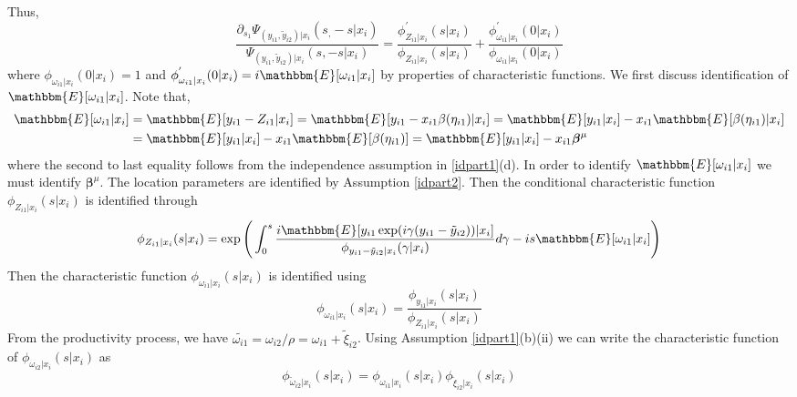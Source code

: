 \documentclass[11pt]{article}
\begin{document}
Thus,
\begin{equation*}
\frac{\partial_{s_{1}}\Psi_{(y_{i1}, \tilde{y}_{i2})|x_{i}}(s_, -s|x_{i})}{\Psi_{(y_{i1}, \tilde{y}_{i2})|x_{i}}(s, -s|x_{i})}=\frac{\phi^{'}_{Z_{i1}|x_{i}}(s|x_{i})}{\phi_{Z_{i1}|x_{i}}(s|x_{i})}+\frac{\phi^{'}_{\omega_{i1}|x_{i}}(0|x_{i})}{\phi_{\omega_{i1}|x_{i}}(0|x_{i})}
\end{equation*}
where $\phi_{\omega_{i1}|x_{i}}(0|x_{i})=1$ and $\phi^{'}_{\omega_{i1}|x_{i}}(0|x_{i})=i\mathbbm{E}[\omega_{i1}|x_{i}]$ by properties of characteristic functions. We first discuss identification of $\mathbbm{E}[\omega_{i1}|x_{i}]$. Note that,
\begin{equation*}
\begin{split}
\mathbbm{E}[\omega_{i1}|x_{i}]&=\mathbbm{E}[y_{i1}-Z_{i1}|x_{i}]=\mathbbm{E}[y_{i1}-x_{i1}\beta(\eta_{i1})|x_{i}]=\mathbbm{E}[y_{i1}|x_{i}]-x_{i1}\mathbbm{E}[\beta(\eta_{i1})|x_{i}]\\
&=\mathbbm{E}[y_{i1}|x_{i}]-x_{i1}\mathbbm{E}[\beta(\eta_{i1})]=\mathbbm{E}[y_{i1}|x_{i}]-x_{i1}\boldsymbol{\beta}^{\mu}
\end{split}
\end{equation*}
where the second to last equality follows from the independence assumption in \eqref{idpart1}(d). In order to identify $\mathbbm{E}[\omega_{i1}|x_{i}]$ we must identify $\boldsymbol{\beta}^{\mu}$. The location parameters are identified by Assumption \ref{idpart2}. Then the conditional characteristic function $\phi_{Z_{i1}|x_{i}}(s|x_{i})$ is identified through
\begin{equation*}
\phi_{Z_{i1}|x_{i}}(s|x_{i})=\exp\Bigg(\int_{0}^{s}\frac{i\mathbbm{E}[y_{i1}\exp(i\gamma(y_{i1}-\tilde{y}_{i2}))|x_{i}]}{\phi_{y_{i1}-\tilde{y}_{i2}|x_{i}}(\gamma|x_{i})}d\gamma-is\mathbbm{E}[\omega_{i1}|x_{i}]\Bigg)
\end{equation*}
Then the characteristic function $\phi_{\omega_{i1}|x_{i}}(s|x_{i})$ is identified using
\begin{equation*}
\phi_{\omega_{i1}|x_{i}}(s|x_{i})=\frac{\phi_{y_{i1}|x_{i}}(s|x_{i})}{\phi_{Z_{i1}|x_{i}}(s|x_{i})}
\end{equation*}
From the productivity process, we have $\tilde{\omega_{i1}}=\omega_{i2}/\rho=\omega_{i1}+\tilde{\xi}_{i2}$. Using Assumption \ref{idpart1}(b)(ii) we can write the characteristic function of $\phi_{\omega_{i2}|x_{i}}(s|x_{i})$ as
\begin{equation*}
\phi_{\tilde{\omega}_{i2}|x_{i}}(s|x_{i})=\phi_{\omega_{i1}|x_{i}}(s|x_{i})\phi_{\tilde{\xi}_{i2}|x_{i}}(s|x_{i})
\end{equation*}
\end{document}
